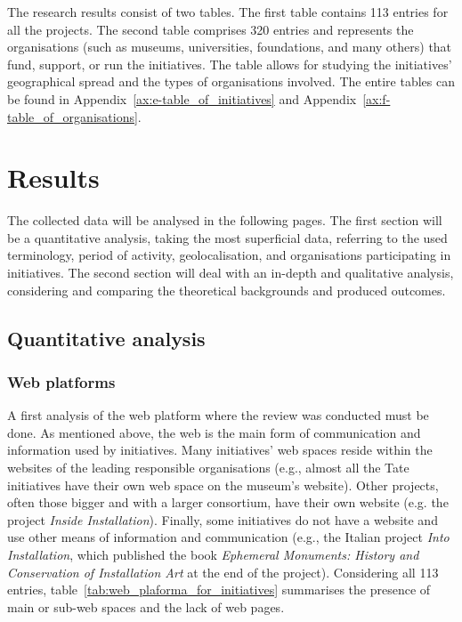 The research results consist of two tables. The first table contains 113 entries for all the projects. The second table comprises 320 entries and represents the organisations (such as museums, universities, foundations, and many others) that fund, support, or run the initiatives. The table allows for studying the initiatives' geographical spread and the types of organisations involved. The entire tables can be found in Appendix~\ref{ax:e-table_of_initiatives} and Appendix~\ref{ax:f-table_of_organisations}.


\section{Results}
The collected data will be analysed in the following pages. The first section will be a quantitative analysis, taking the most superficial data, referring to the used terminology, period of activity, geolocalisation, and organisations participating in initiatives. The second section will deal with an in-depth and qualitative analysis, considering and comparing the theoretical backgrounds and produced outcomes. 


\subsection{Quantitative analysis}

\subsubsection{Web platforms}
A first analysis of the web platform where the review was conducted must be done. As mentioned above, the web is the main form of communication and information used by initiatives. Many initiatives’ web spaces reside within the websites of the leading responsible organisations (e.g., almost all the Tate initiatives have their own web space on the museum's website). Other projects, often those bigger and with a larger consortium, have their own website (e.g. the project \textit{Inside Installation}). Finally, some initiatives do not have a website and use other means of information and communication (e.g., the Italian project \textit{Into Installation}, which published the  book \textit{Ephemeral Monuments: History and Conservation of Installation Art} \cite{pugliese2013ephemeral} at the end of the project). Considering all 113 entries, table~\ref{tab:web_plaforma_for_initiatives} summarises the presence of main or sub-web spaces and the lack of web pages.

